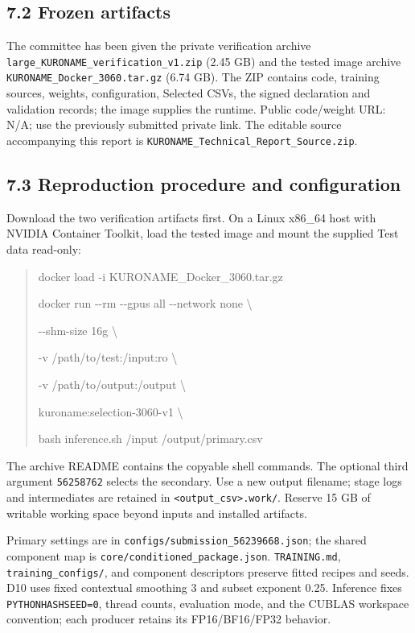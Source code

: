 \documentclass[12pt,a4paper]{article}
\newcommand{\file}[1]{\nolinkurl{#1}}
\begin{document}
\subsection*{7.2 Frozen artifacts}
The committee has been given the private verification archive \file{large_KURONAME_verification_v1.zip} (2.45 GB) and the tested image archive \file{KURONAME_Docker_3060.tar.gz} (6.74 GB). The ZIP contains code, training sources, weights, configuration, Selected CSVs, the signed declaration and validation records; the image supplies the runtime. Public code/weight URL: N/A; use the previously submitted private link. The editable source accompanying this report is \file{KURONAME_Technical_Report_Source.zip}.

\subsection*{7.3 Reproduction procedure and configuration}
Download the two verification artifacts first. On a Linux x86\_64 host with NVIDIA Container Toolkit, load the tested image and mount the supplied Test data read-only:
\begin{quote}\ttfamily\raggedright
docker load -i KURONAME\_Docker\_3060.tar.gz\par
docker run -{}-rm -{}-gpus all -{}-network none \textbackslash\par
\quad -{}-shm-size 16g \textbackslash\par
\quad -v /path/to/test:/input:ro \textbackslash\par
\quad -v /path/to/output:/output \textbackslash\par
\quad kuroname:selection-3060-v1 \textbackslash\par
\quad bash inference.sh /input /output/primary.csv
\end{quote}
The archive README contains the copyable shell commands. The optional third argument \file{56258762} selects the secondary. Use a new output filename; stage logs and intermediates are retained in \file{<output_csv>.work/}. Reserve 15 GB of writable working space beyond inputs and installed artifacts.

Primary settings are in \file{configs/submission_56239668.json}; the shared component map is \file{core/conditioned_package.json}. \file{TRAINING.md}, \file{training_configs/}, and component descriptors preserve fitted recipes and seeds. D10 uses fixed contextual smoothing 3 and subset exponent 0.25. Inference fixes \file{PYTHONHASHSEED=0}, thread counts, evaluation mode, and the CUBLAS workspace convention; each producer retains its FP16/BF16/FP32 behavior.
\end{document}
